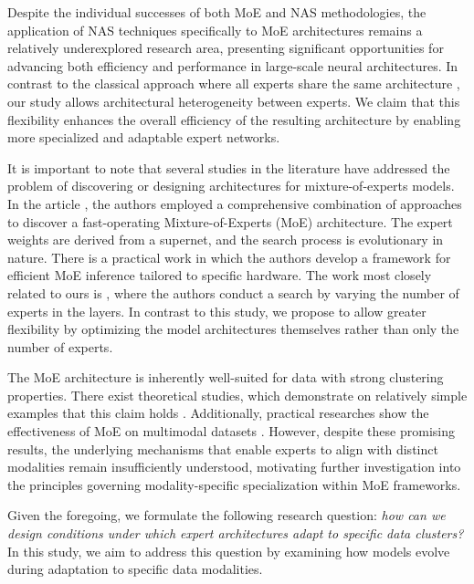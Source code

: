 Despite the individual successes of both MoE and NAS methodologies, the application of NAS techniques specifically to MoE architectures remains a relatively underexplored research area, presenting significant opportunities for advancing both efficiency and performance in large-scale neural architectures.
In contrast to the classical approach where all experts share the same architecture \citep{fedus2022switch}, our study allows architectural heterogeneity between experts.
We claim that this flexibility enhances the overall efficiency of the resulting architecture by enabling more specialized and adaptable expert networks.

It is important to note that several studies in the literature have addressed the problem of discovering or designing architectures for mixture-of-experts models. In the article \cite{jawahar2022automoe}, the authors employed a comprehensive combination of approaches to discover a fast-operating Mixture-of-Experts (MoE) architecture. The expert weights are derived from a supernet, and the search process is evolutionary in nature. There is a practical work \cite{han2024cmn} in which the authors develop a framework for efficient MoE inference tailored to specific hardware. The work most closely related to ours is \cite{mecharbat2025moenas}, where the authors conduct a search by varying the number of experts in the layers. In contrast to this study, we propose to allow greater flexibility by optimizing the model architectures themselves rather than only the number of experts.

The MoE architecture is inherently well-suited for data with strong clustering properties. There exist theoretical studies, which demonstrate on relatively simple examples that this claim holds \cite{chen2022towards}.
Additionally, practical researches show the effectiveness of MoE on multimodal datasets \cite{chai2022mixture, guo2018multi, hu2025multi}.
However, despite these promising results, the underlying mechanisms that enable experts to align with distinct modalities remain insufficiently understood, motivating further investigation into the principles governing modality-specific specialization within MoE frameworks.

Given the foregoing, we formulate the following research question:
\textit{how can we design conditions under which expert architectures adapt to specific data clusters?}
In this study, we aim to address this question by examining how models evolve during adaptation to specific data modalities.









